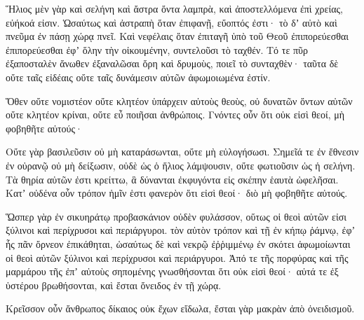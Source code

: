 {\par }{\PP {}Ἥλιος μὲν γὰρ καὶ σελήνη καὶ ἄστρα ὄντα λαμπρὰ, καὶ ἀποστελλόμενα ἐπὶ χρείας, εὐήκοά εἰσιν.
Ὡσαύτως καὶ ἀστραπὴ ὅταν ἐπιφανῇ, εὔοπτός ἐστι· τὸ δʼ αὐτὸ καὶ πνεῦμα ἐν πάσῃ χώρᾳ πνεῖ.
Καὶ νεφέλαις ὅταν ἐπιταγῆ ὑπὸ τοῦ Θεοῦ ἐπιπορεύεσθαι ἐπιπορεύεσθαι ἐφʼ ὅλην τὴν οἰκουμένην, συντελοῦσι τὸ ταχθέν.
Τό τε πῦρ ἐξαποσταλὲν ἄνωθεν ἐξαναλῶσαι ὄρη καὶ δρυμοὺς, ποιεῖ τὸ συνταχθὲν· ταῦτα δὲ οὔτε ταῖς εἰδέαις οὔτε ταῖς δυνάμεσιν αὐτῶν ἀφωμοιωμένα ἐστίν.
\par }{\PP {}Ὅθεν οὔτε νομιστέον οὔτε κλητέον ὑπάρχειν αὐτοὺς θεοὺς, οὐ δυνατῶν ὄντων αὐτῶν οὔτε κλητέον κρίναι, οὔτε εὖ ποιῆσαι ἀνθρώποις.
Γνόντες οὖν ὅτι οὐκ εἰσὶ θεοί, μὴ φοβηθῆτε αὐτούς·
\par }{\PP {}Οὔτε γὰρ βασιλεῦσιν οὐ μὴ καταράσωνται, οὔτε μὴ εὐλογήσωσι.
Σημεῖά τε ἐν ἔθνεσιν ἐν οὐρανῷ οὐ μὴ δείξωσιν, οὐδὲ ὡς ὁ ἥλιος λάμψουσιν, οὔτε φωτιοῦσιν ὡς ἡ σελήνη.
Τὰ θηρία αὐτῶν ἐστι κρείττω, ἃ δύνανται ἐκφυγόντα εἰς σκέπην ἑαυτὰ ὠφελῆσαι.
Κατʼ οὐδένα οὖν τρόπον ἡμῖν ἑστι φανερὸν ὅτι εἰσὶ θεοί· διὸ μὴ φοβηθῆτε αὐτούς.
\par }{\PP {}Ὥσπερ γὰρ ἐν σικυηράτῳ προβασκάνιον οὐδὲν φυλάσσον, οὕτως οἱ θεοὶ αὐτῶν εἰσι ξύλινοι καὶ περίχρυσοι καὶ περιάργυροι.
τὸν αὐτὸν τρόπον καὶ τῇ ἐν κήπῳ ῥάμνῳ, ἐφʼ ἧς πᾶν ὄρνεον ἐπικάθηται, ὡσαύτως δὲ καὶ νεκρῷ ἐῤῥιμμένῳ ἐν σκότει ἀφωμοίωνται οἱ θεοὶ αὐτῶν ξύλινοι καὶ περίχρυσοι καὶ περιάργυροι.
Ἀπό τε τῆς πορφύρας καὶ τῆς μαρμάρου τῆς ἐπʼ αὐτοὺς σηπομένης γνωσθήσονται ὅτι οὐκ εἰσὶ θεοί· αὐτά τε ἐξ ὑστέρου βρωθήσονται, καὶ ἔσται ὄνειδος ἐν τῇ χώρᾳ.
\par }{\PP {}Κρεῖσσον οὖν ἄνθρωπος δίκαιος οὐκ ἔχων εἴδωλα, ἔσται γὰρ μακρὰν ἀπὸ ὀνειδισμοῦ.
\par }